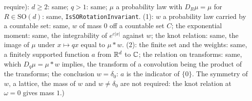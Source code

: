 \begin{proposition}
{require): $d \ge 2$: same; $q > 1$: same; $\mu$ a probability law with $D_R\mu = \mu$ for
$R \in \mathrm{SO}(d)$: same, \texttt{IsSORotationInvariant}. (1): $w$ a probability law carried by
a countable set: same, $w$ of mass $0$ off a countable set $C$; the exponential moment: same, the
integrability of $e^{c|x|}$ against $w$; the knot relation: same, the image of $\mu$ under
$x \mapsto qx$ equal to $\mu * w$. (2): the finite set and the weights: same, a finitely supported
function $a$ from $\mathbb{R}^d$ to $\mathbb{C}$; the relation on transforms: same, which $D_q\mu = \mu * w$
implies, the transform of a convolution being the product of the transforms; the conclusion
$w = \delta_0$: $a$ is the indicator of $\{0\}$. The symmetry of $w$, a lattice, the mass of $w$
and $w \ne \delta_0$ are not required: the knot relation at $\omega = 0$ gives mass $1$.)}
\end{proposition}

